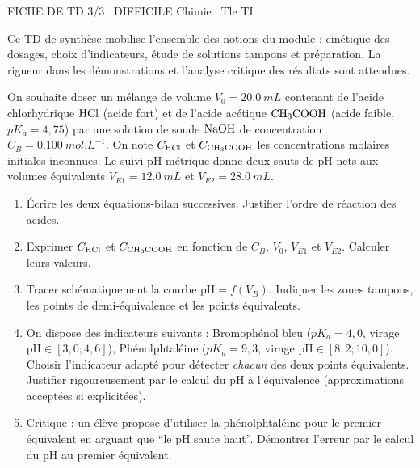 \documentclass[11pt]{article}
\begin{document}
\begin{tcolorbox}[enhanced,colback=popink,colframe=popink,arc=10pt,boxrule=0pt,left=12pt,right=12pt,top=9pt,bottom=9pt]
{\color{white}\popxbold\small FICHE DE TD 3/3 \textbullet\ DIFFICILE \hfill Chimie \textbullet\ Tle TI\par}
\end{tcolorbox}
\vspace{4pt}
Ce TD de synthèse mobilise l'ensemble des notions du module : cinétique des dosages, choix d'indicateurs, étude de solutions tampons et préparation. La rigueur dans les démonstrations et l'analyse critique des résultats sont attendues.

\begin{exercice}
On souhaite doser un mélange de volume $V_0 = \SI{20,0}{mL}$ contenant de l'acide chlorhydrique $\ce{HCl}$ (acide fort) et de l'acide acétique $\ce{CH3COOH}$ (acide faible, $pK_a = 4,75$) par une solution de soude $\ce{NaOH}$ de concentration $C_B = \SI{0,100}{mol.L^{-1}}$. On note $C_{\ce{HCl}}$ et $C_{\ce{CH3COOH}}$ les concentrations molaires initiales inconnues. Le suivi pH-métrique donne deux sauts de pH nets aux volumes équivalents $V_{E1} = \SI{12,0}{mL}$ et $V_{E2} = \SI{28,0}{mL}$.
\begin{enumerate}
    \item Écrire les deux équations-bilan successives. Justifier l'ordre de réaction des acides.
    \item Exprimer $C_{\ce{HCl}}$ et $C_{\ce{CH3COOH}}$ en fonction de $C_B$, $V_0$, $V_{E1}$ et $V_{E2}$. Calculer leurs valeurs.
    \item Tracer schématiquement la courbe $\text{pH} = f(V_B)$. Indiquer les zones tampons, les points de demi-équivalence et les points équivalents.
    \item On dispose des indicateurs suivants : Bromophénol bleu ($pK_a = 4,0$, virage $\text{pH} \in [3,0; 4,6]$), Phénolphtaléine ($pK_a = 9,3$, virage $\text{pH} \in [8,2; 10,0]$). Choisir l'indicateur adapté pour détecter \textit{chacun} des deux points équivalents. Justifier rigoureusement par le calcul du pH à l'équivalence (approximations acceptées si explicitées).
    \item Critique : un élève propose d'utiliser la phénolphtaléine pour le premier équivalent en arguant que ``le pH saute haut''. Démontrer l'erreur par le calcul du pH au premier équivalent.
\end{enumerate}
\end{exercice}
\end{document}
